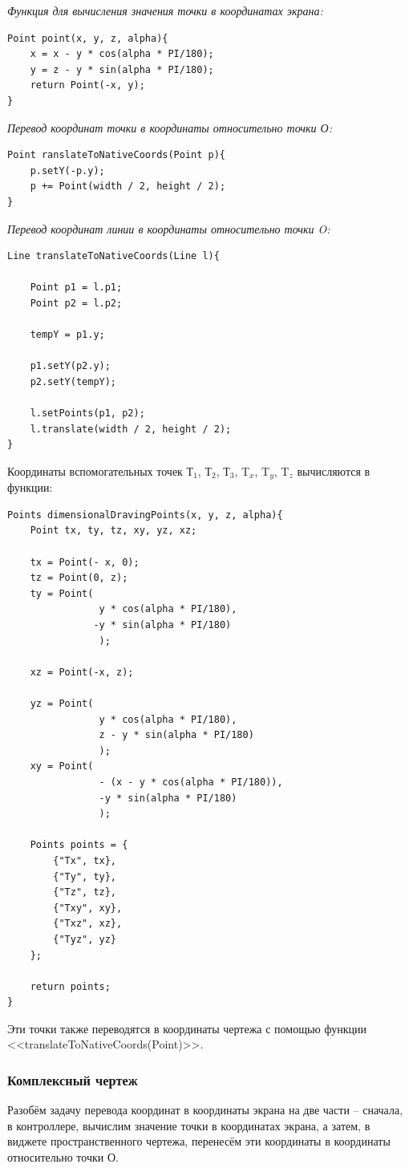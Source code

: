 \documentclass[13pt]{extarticle}
\begin{document}
\emph{Функция для вычисления значения точки в координатах экрана:}
\lstset {language=C++}
\begin{lstlisting}
Point point(x, y, z, alpha){
    x = x - y * cos(alpha * PI/180);
    y = z - y * sin(alpha * PI/180);
    return Point(-x, y);
}
\end{lstlisting}
\emph{Перевод координат точки в координаты относительно точки О:}
\begin{lstlisting}
Point ranslateToNativeCoords(Point p){
    p.setY(-p.y);
    p += Point(width / 2, height / 2);
}
\end{lstlisting}
\emph{Перевод координат линии в координаты относительно точки O:}
\begin{lstlisting}
Line translateToNativeCoords(Line l){

    Point p1 = l.p1;
    Point p2 = l.p2;

    tempY = p1.y;

    p1.setY(p2.y);
    p2.setY(tempY);

    l.setPoints(p1, p2);
    l.translate(width / 2, height / 2);
}
\end{lstlisting}

Координаты вспомогательных точек Т$_1$, Т$_2$, Т$_3$, T$_x$, T$_y$, T$_z$ вычисляются в функции:
\begin{lstlisting}
Points dimensionalDravingPoints(x, y, z, alpha){
    Point tx, ty, tz, xy, yz, xz;
    
    tx = Point(- x, 0);
    tz = Point(0, z);
    ty = Point(
                y * cos(alpha * PI/180),
               -y * sin(alpha * PI/180)
                );

    xz = Point(-x, z);

    yz = Point(
                y * cos(alpha * PI/180),
                z - y * sin(alpha * PI/180)
                );
    xy = Point(
                - (x - y * cos(alpha * PI/180)),
                -y * sin(alpha * PI/180)
                );

    Points points = {
        {"Tx", tx},
        {"Ty", ty},
        {"Tz", tz},
        {"Txy", xy},
        {"Txz", xz},
        {"Tyz", yz}
    };

    return points;
}
\end{lstlisting}
Эти точки также переводятся в координаты чертежа с помощью функции
\\
<<translateToNativeCoords(Point)>>.

\subsubsection{Комплексный чертеж}
Разобём задачу перевода координат в координаты экрана на две части -- сначала, в контроллере, вычислим значение точки в координатах экрана, а затем, в виджете пространственного чертежа, перенесём эти координаты в координаты относительно точки О.
\end{document}

